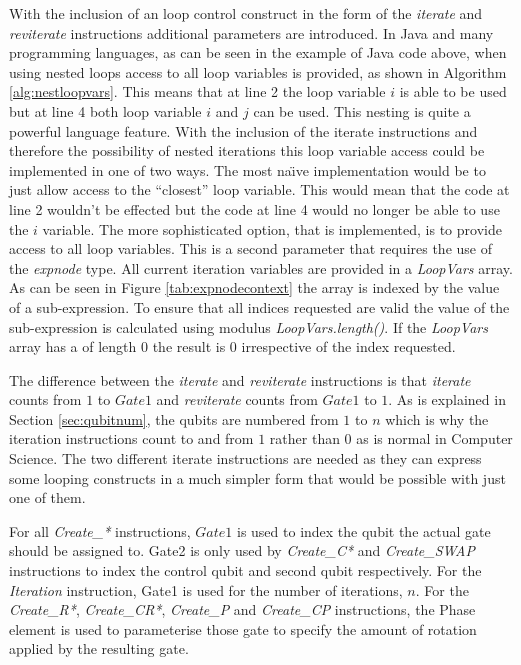 With the inclusion of an loop control construct in the form of the \emph{iterate} and \emph{reviterate} instructions additional parameters are introduced.
In Java and many programming languages, as can be seen in the example of Java code above, when using nested loops access to all loop variables is provided, as shown in Algorithm \ref{alg:nestloopvars}.
This means that at line 2 the loop variable $i$ is able to be used but at line 4 both loop variable $i$ and $j$ can be used.
This nesting is quite a powerful language feature.
With the inclusion of the iterate instructions and therefore the possibility of nested iterations this loop variable access could be implemented in one of two ways.
The most na\"{\i}ve implementation would be to just allow access to the ``closest'' loop variable.
This would mean that the code at line 2 wouldn't be effected but the code at line 4 would no longer be able to use the $i$ variable.
The more sophisticated option, that is implemented, is to provide access to all loop variables.
This is a second parameter that requires the use of the \emph{expnode} type.
All current iteration variables are provided in a \emph{LoopVars} array.
As can be seen in Figure \ref{tab:expnodecontext} the array is indexed by the value of a sub-expression.
To ensure that all indices requested are valid the value of the sub-expression is calculated using modulus \emph{LoopVars.length()}.
If the \emph{LoopVars} array has a of length $0$ the result is $0$ irrespective of the index requested.

The difference between the \emph{iterate} and \emph{reviterate} instructions is that \emph{iterate} counts from $1$ to $Gate1$ and \emph{reviterate} counts from $Gate1$ to $1$.
As is explained in Section \ref{sec:qubitnum}, the qubits are numbered from $1$ to $n$ which is why the iteration instructions count to and from $1$ rather than $0$ as is normal in Computer Science.
The two different iterate instructions are needed as they can express some looping constructs in a much simpler form that would be possible with just one of them.

For all \emph{Create\_*} instructions, $Gate1$ is used to index the qubit the actual gate should be assigned to.
Gate2 is only used by \emph{Create\_C*} and \emph{Create\_SWAP} instructions to index the control qubit and second qubit respectively.
For the \emph{Iteration} instruction, Gate1 is used for the number of iterations, $n$.
For the \emph{Create\_R*}, \emph{Create\_CR*}, \emph{Create\_P} and  \emph{Create\_CP} instructions, the Phase element is used to parameterise those gate to specify the amount of rotation applied by the resulting gate.


